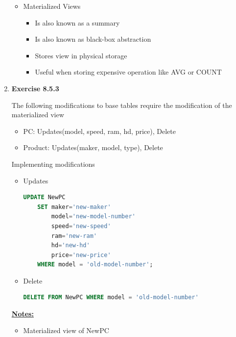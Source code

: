 \documentclass[12pt]{article}
\begin{document}
\begin{enumerate}[1.]
    \bigskip

    \begin{itemize}
        \item Materialized Views
        \begin{itemize}
            \item Is also known as a summary
            \item Is also known as black-box abstraction
            \item Stores view in physical storage
            \item Useful when storing expensive operation like AVG or COUNT
        \end{itemize}
    \end{itemize}
    \item \textbf{Exercise 8.5.3}

    \bigskip

    The following modifications to base tables require the modification of the
    materialized view

    \begin{itemize}
        \item PC: Updates(model, speed, ram, hd, price), Delete
        \item Product: Updates(maker, model, type), Delete
    \end{itemize}

    \bigskip

    Implementing modifications

    \begin{itemize}
        \item Updates

    \begin{lstlisting}[language=SQL]
    UPDATE NewPC
    SET maker='new-maker'
        model='new-model-number'
        speed='new-speed'
        ram='new-ram'
        hd='new-hd'
        price='new-price'
    WHERE model = 'old-model-number';
    \end{lstlisting}

        \item Delete

    \begin{lstlisting}[language=SQL]
    DELETE FROM NewPC WHERE model = 'old-model-number'
    \end{lstlisting}
    \end{itemize}

    \underline{\textbf{Notes:}}

    \begin{itemize}
        \item Materialized view of NewPC


\end{itemize}
\end{enumerate}
\end{document}

